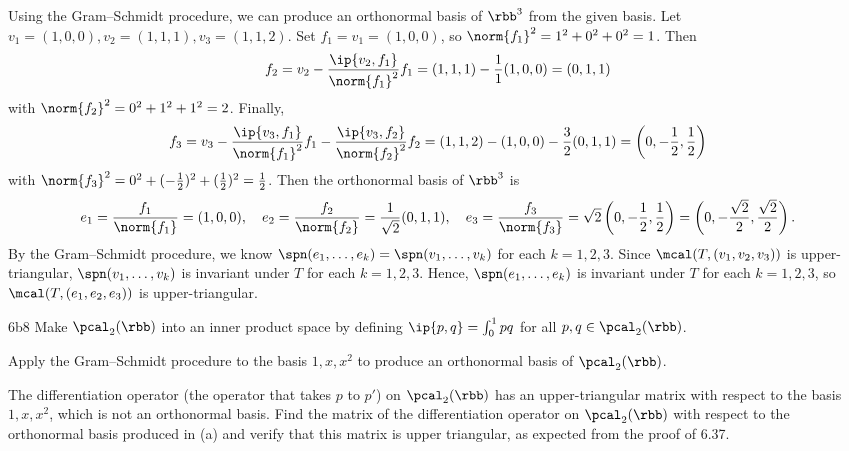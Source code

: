 \begin{sol}
    Using the Gram--Schmidt procedure, we can produce an orthonormal basis of $\rbb^3$ from the given basis.
    Let $v_1 = (1, 0, 0), v_2 = (1, 1, 1), v_3 = (1, 1, 2)$.
    Set $f_1 = v_1 = (1, 0, 0)$, so $\norm{f_1}^2 = 1^2 + 0^2 + 0^2 = 1$.
    Then
    \[
        f_2 = v_2 - \frac{\ip{v_2, f_1}}{\norm{f_1}^2}f_1 = (1, 1, 1) - \frac{1}{1}(1, 0, 0) = (0, 1, 1)
    \]
    with $\norm{f_2}^2 = 0^2 + 1^2 + 1^2 = 2$.
    Finally,
    \[
        f_3 = v_3 - \frac{\ip{v_3, f_1}}{\norm{f_1}^2}f_1 - \frac{\ip{v_3, f_2}}{\norm{f_2}^2}f_2 = (1, 1, 2) - (1, 0, 0) - \frac{3}{2}(0, 1, 1) = \left(0, -\frac{1}{2}, \frac{1}{2}\right)
    \]
    with $\norm{f_3}^2 = 0^2 + (-\frac{1}{2})^2 + (\frac{1}{2})^2 = \frac{1}{2}$.
    Then the orthonormal basis of $\rbb^3$ is
    \[
        e_1 = \frac{f_1}{\norm{f_1}} = (1, 0, 0), \quad
        e_2 = \frac{f_2}{\norm{f_2}} = \frac{1}{\sqrt{2}}(0, 1, 1), \quad
        e_3 = \frac{f_3}{\norm{f_3}} = \sqrt{2}\left(0, -\frac{1}{2}, \frac{1}{2}\right) = \left(0, -\frac{\sqrt{2}}{2}, \frac{\sqrt{2}}{2}\right).
    \]
    By the Gram--Schmidt procedure, we know $\spn(e_1, \ldots, e_k) = \spn(v_1, \ldots, v_k)$ for each $k = 1, 2, 3$.
    Since $\mcal(T, (v_1, v_2, v_3))$ is upper-triangular, $\spn(v_1, \ldots, v_k)$ is invariant under $T$ for each $k = 1, 2, 3$.
    Hence, $\spn(e_1, \ldots, e_k)$ is invariant under $T$ for each $k = 1, 2, 3$, so $\mcal(T, (e_1, e_2, e_3))$ is upper-triangular.
\end{sol}

\begin{exercise}{6b8}
    Make $\pcal_2(\rbb)$ into an inner product space by defining $\ip{p, q} = \int_0^1 pq$ for all $p, q \in \pcal_2(\rbb)$.
    \begin{subexercises}
        \item Apply the Gram--Schmidt procedure to the basis $1, x, x^2$ to produce an orthonormal basis of $\pcal_2(\rbb)$.
        \item The differentiation operator (the operator that takes $p$ to $p'$) on $\pcal_2(\rbb)$ has an upper-triangular matrix with respect to the basis $1, x, x^2$, which is not an orthonormal basis.
        Find the matrix of the differentiation operator on $\pcal_2(\rbb)$ with respect to the orthonormal basis produced in (a) and verify that this matrix is upper triangular, as expected from the proof of 6.37.
    \end{subexercises}
\end{exercise}

